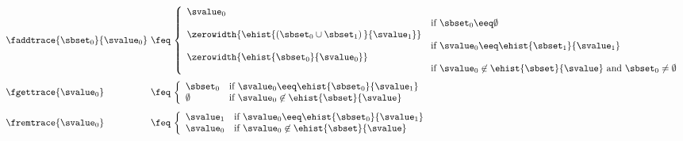 \begin{figure}[t]
\begin{minipage}[t]{0.4\columnwidth}
  \end{minipage}\begin{minipage}[t][][c]{0.6\columnwidth}
    \vspace{-3mm}
    \begin{flushleft}\(\begin{array}[t]{l@{~}c@{~}l}
    \faddtrace{\sbset_0}{\svalue_0} & \feq &
     \left\{\begin{array}{ll}
        \svalue_0
        \\ & \mbox{if $\sbset_0 \eeq \emptyset$}
        \\
        \zerowidth{\ehist{(\sbset_0 \cup \sbset_1)\,}{\svalue_1}}
        \\ & \mbox{if $\svalue_0 \eeq \ehist{\sbset_1}{\svalue_1}$}
        \\
        \zerowidth{\ehist{\sbset_0}{\svalue_0}}
        \\ & \mbox{if $\svalue_0 \not\in \ehist{\sbset}{\svalue}$ and $\sbset_0 \neq \emptyset\!\!\!\!$}
      \end{array}\right.
      \\[13mm]
    \fgettrace{\svalue_0} & \feq &
      \left\{\begin{array}{ll}
        \sbset_0
        & \mbox{if $\svalue_0 \eeq \ehist{\sbset_0}{\svalue_1}$}
        \\
        \emptyset
        & \mbox{if $\svalue_0 \not\in \ehist{\sbset}{\svalue}$}
      \end{array}\right.
      \\[5mm]
    \fremtrace{\svalue_0} & \feq &
      \left\{\begin{array}{ll}
        \svalue_1
        & \mbox{if $\svalue_0 \eeq \ehist{\sbset_0}{\svalue_1}$}
        \\
        \svalue_0
        & \mbox{if $\svalue_0 \not\in \ehist{\sbset}{\svalue}$}
      \end{array}\right.
  \end{array} \) \end{flushleft}
  \end{minipage}

\end{figure}
